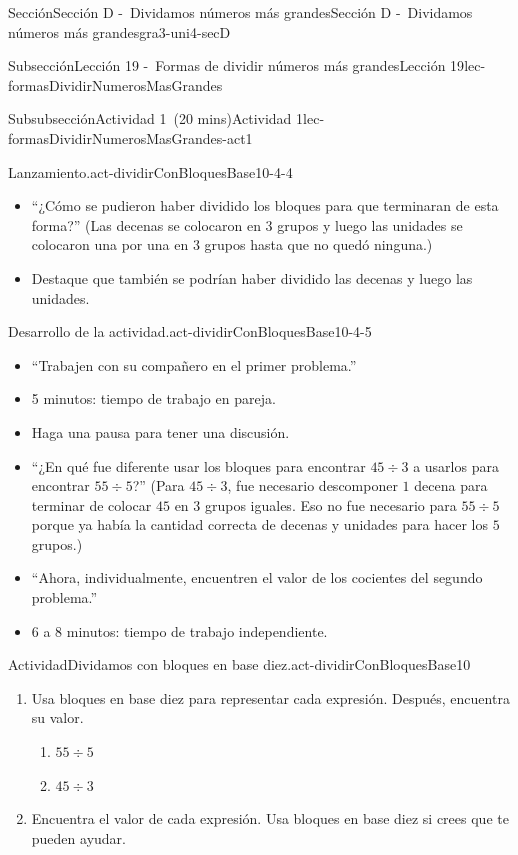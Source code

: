 \documentclass[oneside,10pt,]{article}
\begin{document}
\begin{sectionptx}{Sección}{Sección D -~Dividamos números más grandes}{}{Sección D -~Dividamos números más grandes}{}{}{gra3-uni4-secD}
\begin{subsectionptx}{Subsección}{Lección 19 -~Formas de dividir números más grandes}{}{Lección 19}{}{}{lec-formasDividirNumerosMasGrandes}
\begin{subsubsectionptx}{Subsubsección}{Actividad 1~(20 mins)}{}{Actividad 1}{}{}{lec-formasDividirNumerosMasGrandes-act1}
\begin{paragraphs}{Lanzamiento.}{act-dividirConBloquesBase10-4-4}
\begin{itemize}[label=\textbullet]
\item{}``¿Cómo se pudieron haber dividido los bloques para que terminaran de esta forma?'' (Las decenas se colocaron en \(3\) grupos y luego las unidades se colocaron una por una en \(3\) grupos hasta que no quedó ninguna.)%
\item{}Destaque que también se podrían haber dividido las decenas y luego las unidades.%
\end{itemize}
\end{paragraphs}%
\begin{paragraphs}{Desarrollo de la actividad.}{act-dividirConBloquesBase10-4-5}%
%
\begin{itemize}[label=\textbullet]
\item{}``Trabajen con su compañero en el primer problema.''%
\item{}5 minutos: tiempo de trabajo en pareja.%
\item{}Haga una pausa para tener una discusión.%
\item{}``¿En qué fue diferente usar los bloques para encontrar \(45 \div 3\) a usarlos para encontrar \(55 \div 5\)?'' (Para \(45 \div 3\), fue necesario descomponer \(1\) decena para terminar de colocar \(45\) en \(3\) grupos iguales. Eso no fue necesario para \(55 \div 5\) porque ya había la cantidad correcta de decenas y unidades para hacer los \(5\) grupos.)%
\item{}``Ahora, individualmente, encuentren el valor de los cocientes del segundo problema.''%
\item{}6 a 8 minutos: tiempo de trabajo independiente.%
\end{itemize}
\end{paragraphs}%
\begin{activity}{Actividad}{Dividamos con bloques en base diez.}{act-dividirConBloquesBase10}%
\begin{sidebyside}{2}{0}{0}{0.1}%
\begin{sbspanel}{0.7}%
%
\begin{enumerate}
\item{}Usa bloques en base diez para representar cada expresión. Después, encuentra su valor.%
%
\begin{enumerate}
\item{}\(\displaystyle 55 \div 5\)%
\item{}\(\displaystyle 45 \div 3\)%
\end{enumerate}
\item{}Encuentra el valor de cada expresión. Usa bloques en base diez si crees que te pueden ayudar.%

\end{enumerate}
\end{sbspanel}
\end{sidebyside}
\end{activity}
\end{subsubsectionptx}
\end{subsectionptx}
\end{sectionptx}
\end{document}
